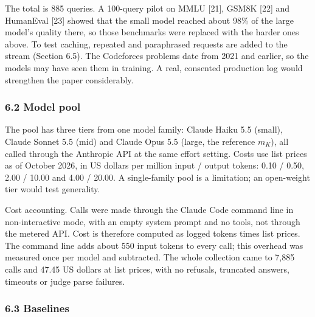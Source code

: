\documentclass[
  10pt,
]{article}
\begin{document}
The total is 885 queries. A 100-query pilot on MMLU {[}21{]}, GSM8K
{[}22{]} and HumanEval {[}23{]} showed that the small model reached
about 98\% of the large model's quality there, so those benchmarks were
replaced with the harder ones above. To test caching, repeated and
paraphrased requests are added to the stream (Section 6.5). The
Codeforces problems date from 2021 and earlier, so the models may have
seen them in training. A real, consented production log would strengthen
the paper considerably.

\subsubsection{6.2 Model pool}\label{model-pool}

The pool has three tiers from one model family: Claude Haiku 5.5
(small), Claude Sonnet 5.5 (mid) and Claude Opus 5.5 (large, the
reference \(m_K\)), all called through the Anthropic API at the same
effort setting. Costs use list prices as of October 2026, in US dollars
per million input / output tokens: 0.10 / 0.50, 2.00 / 10.00 and 4.00 /
20.00. A single-family pool is a limitation; an open-weight tier would
test generality.

Cost accounting. Calls were made through the Claude Code command line in
non-interactive mode, with an empty system prompt and no tools, not
through the metered API. Cost is therefore computed as logged tokens
times list prices. The command line adds about 550 input tokens to every
call; this overhead was measured once per model and subtracted. The
whole collection came to 7,885 calls and 47.45 US dollars at list
prices, with no refusals, truncated answers, timeouts or judge parse
failures.

\subsubsection{6.3 Baselines}\label{baselines}
\end{document}
